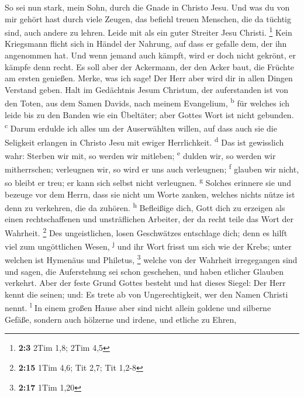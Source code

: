  So sei nun stark, mein Sohn, durch die Gnade in Christo
Jesu.  Und was du von mir gehört hast durch viele Zeugen,
das befiehl treuen Menschen, die da tüchtig sind, auch andere zu lehren.
 Leide mit als ein guter Streiter Jesu Christi.
\footnote{\textbf{2:3} 2Tim 1,8; 2Tim 4,5}  Kein
Kriegsmann flicht sich in Händel der Nahrung, auf dass er gefalle dem,
der ihn angenommen hat.  Und wenn jemand auch kämpft, wird
er doch nicht gekrönt, er kämpfe denn recht.  Es soll aber
der Ackermann, der den Acker baut, die Früchte am ersten genießen.
Merke, was ich sage!  Der Herr aber wird dir in allen
Dingen Verstand geben.  Halt im Gedächtnis Jesum Christum,
der auferstanden ist von den Toten, aus dem Samen Davids, nach meinem
Evangelium, \textsuperscript{b}  für welches ich leide bis
zu den Banden wie ein Übeltäter; aber Gottes Wort ist nicht gebunden.
\textsuperscript{c}  Darum erdulde ich alles um der
Auserwählten willen, auf dass auch sie die Seligkeit erlangen in Christo
Jesu mit ewiger Herrlichkeit. \textsuperscript{d}  Das
ist gewisslich wahr: Sterben wir mit, so werden wir mitleben;
\textsuperscript{e}  dulden wir, so werden wir
mitherrschen; verleugnen wir, so wird er uns auch verleugnen;
\textsuperscript{f}  glauben wir nicht, so bleibt er
treu; er kann sich selbst nicht verleugnen. \textsuperscript{g}
 Solches erinnere sie und bezeuge vor dem Herrn, dass sie
nicht um Worte zanken, welches nichts nütze ist denn zu verkehren, die
da zuhören. \textsuperscript{h}  Befleißige dich, Gott
dich zu erzeigen als einen rechtschaffenen und unsträflichen Arbeiter,
der da recht teile das Wort der Wahrheit. \footnote{\textbf{2:15} 1Tim
  4,6; Tit 2,7; Tit 1,2-8}  Des ungeistlichen, losen
Geschwätzes entschlage dich; denn es hilft viel zum ungöttlichen Wesen,
\textsuperscript{j}  und ihr Wort frisst um sich wie der
Krebs; unter welchen ist Hymenäus und Philetus, \footnote{\textbf{2:17}
  1Tim 1,20}  welche von der Wahrheit irregegangen sind
und sagen, die Auferstehung sei schon geschehen, und haben etlicher
Glauben verkehrt.  Aber der feste Grund Gottes besteht
und hat dieses Siegel: Der Herr kennt die seinen; und: Es trete ab von
Ungerechtigkeit, wer den Namen Christi nennt. \textsuperscript{l}
 In einem großen Hause aber sind nicht allein goldene und
silberne Gefäße, sondern auch hölzerne und irdene, und etliche zu Ehren,
